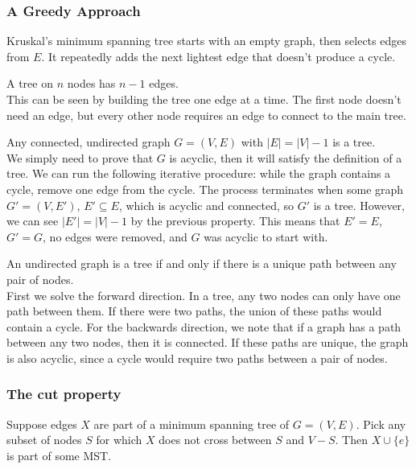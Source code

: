 \subsubsection{A Greedy Approach}
Kruskal's minimum spanning tree starts with an empty graph, then selects edges from $E$.
It repeatedly adds the next lightest edge that doesn't produce a cycle.
\begin{property} 
  A tree on $n$ nodes has $n-1$ edges.\\
  This can be seen by building the tree one edge at a time.
  The first node doesn't need an edge, but every other node requires an edge to connect to the main tree.
\end{property}
\begin{property}
  Any connected, undirected graph $G = (V, E)$ with $|E| = |V| - 1$ is a tree.\\
  We simply need to prove that $G$ is acyclic, then it will satisfy the definition of a tree.
  We can run the following iterative procedure: while the graph contains a cycle, remove one edge from the cycle.
  The process terminates when some graph $G' = (V, E')$, $E' \subseteq E$, which is acyclic and connected, so $G'$ is a tree.
  However, we can see $|E'| = |V| - 1$ by the previous property.
  This means that $E' = E$, $G' = G$, no edges were removed, and $G$ was acyclic to start with.
\end{property}
\begin{property}
  An undirected graph is a tree if and only if there is a unique path between any pair of nodes.\\
  First we solve the forward direction.
  In a tree, any two nodes can only have one path between them.
  If there were two paths, the union of these paths would contain a cycle.
  For the backwards direction, we note that if a graph has a path between any two nodes, then it is connected.
  If these paths are unique, the graph is also acyclic, since a cycle would require two paths between a pair of nodes.
\end{property}

\subsubsection{The cut property}
\begin{property}
  Suppose edges $X$ are part of a minimum spanning tree of $G = (V, E)$.
  Pick any subset of nodes $S$ for which $X$ does not cross between $S$ and $V-S$.
  Then $X \cup \{e\}$ is part of some MST.
\end{property}

